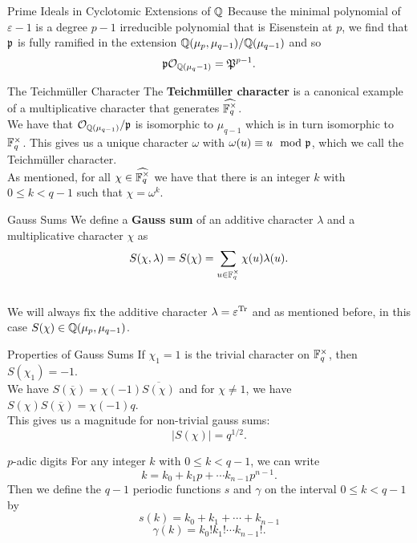 \documentclass[presentation]{beamer}
\begin{document}
\begin{frame}{Prime Ideals in Cyclotomic Extensions of $\mathbb{Q}$}
Because the minimal polynomial of $\varepsilon - 1$ is a degree $p-1$ irreducible polynomial that is Eisenstein at $p$, we find that $\mathfrak{p}$ is fully ramified in the extension $\mathbb{Q}(\mu_p, \mu_{q-1}) / \mathbb{Q}(\mu_{q-1})$ and so \[\mathfrak{p} \mathcal{O}_{\mathbb{Q}(\mu_q-1)} = \mathfrak{P}^{p-1}.\]
\end{frame}

\begin{frame}{The Teichm\"uller Character}
The \textbf{Teichm\"uller character} is a canonical example of a multiplicative character that generates $\widehat{\mathbb{F}_q^\times}$.\\

We have that $\mathcal{O}_{\mathbb{Q}(\mu_{q-1})} / \mathfrak{p}$ is isomorphic to $\mu_{q-1}$ which is in turn isomorphic to $\mathbb{F}_q^\times$. This gives us a unique character $\omega$ with $\omega(u) \equiv u \mod {\mathfrak{p}}$, which we call the Teichm\"uller character.
\\
As mentioned, for all $\chi \in \widehat{\mathbb{F}_q^\times}$ we have that there is an integer $k$ with $0 \leq k < q-1$ such that $\chi = \omega^k$.
\end{frame}

\begin{frame}{Gauss Sums}
We define a \textbf{Gauss sum} of an additive character $\lambda$ and a multiplicative character $\chi$ as \[S(\chi, \lambda) = S(\chi) = \sum_{u \in \mathbb{F}_q^\times} \chi(u) \lambda(u).\]
\\

We will always fix the additive character $\lambda = \varepsilon^{\textrm{Tr}}$ and as mentioned before, in this case $S(\chi) \in \mathbb{Q}(\mu_p, \mu_{q-1})$. 
\end{frame}

\begin{frame}{Properties of Gauss Sums}
If $\chi_1 = 1$ is the trivial character on $\mathbb{F}_q^\times$, then $S(\chi_1) = -1$.\\

We have $S(\overline{\chi}) = \chi(-1)\overline{S(\chi)}$ and for $\chi \neq 1$, we have $S(\chi) S(\overline{\chi}) = \chi(-1) q$.
\\

This gives us a magnitude for non-trivial gauss sums: 
\[ |S(\chi)| = q^{1/2}.\]
\end{frame}


\begin{frame}{$p$-adic digits}
For any integer $k$ with $0 \leq k < q-1$, we can write \[k = k_0 + k_1 p + \cdots k_{n-1} p^{n-1}.\]
Then we define the $q-1$ periodic functions $s$ and $\gamma$ on the interval $0 \leq k < q-1$ by
\[s(k) = k_0 + k_1 + \cdots +k_{n-1} \]
\[\gamma(k) = k_0! k_1! \cdots k_{n-1}!.\]
\end{frame}
\end{document}

